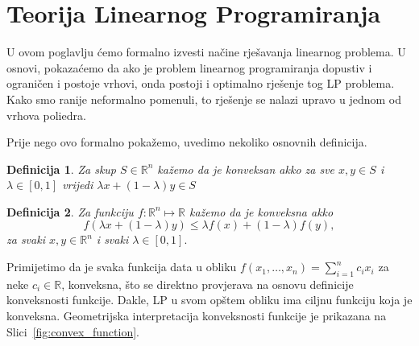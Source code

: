 \documentclass[a4paper, utf8, 11pt, colorlinks]{book}
\newtheorem{definition}{Definicija}
\begin{document}
\section{Teorija Linearnog Programiranja}
U ovom poglavlju ćemo formalno izvesti načine rješavanja linearnog problema. U osnovi, pokazaćemo da ako je problem
linearnog programiranja dopustiv i ograničen i postoje vrhovi, onda postoji i optimalno rješenje tog LP problema. Kako smo ranije neformalno pomenuli,  to rješenje se nalazi upravo u jednom od vrhova poliedra. 

Prije nego ovo formalno pokažemo, uvedimo nekoliko osnovnih definicija. 

\begin{definition}
  Za skup $S \in \mathbb{R}^n$ kažemo da je konveksan akko za sve $x,y\in S$ i $\lambda\in [0, 1]$ vrijedi $\lambda x + (1 - \lambda)y \in S$
\end{definition}
\begin{definition}
   Za funkciju $f:\mathbb{R}^n \mapsto \mathbb{R}$ kažemo da je konveksna akko 
   $$ f( \lambda x + (1-\lambda) y) \leq \lambda f(x) + (1 -\lambda) f(y),$$
   za svaki $x,y \in \mathbb{R}^n$ i svaki $\lambda \in [0,1].$
\end{definition}
Primijetimo da je svaka funkcija data u obliku $f(x_1, \ldots, x_n) = \sum_{i=1}^n c_i x_i$ za neke $c_i \in \mathbb{R}$, konveksna, što se direktno provjerava na osnovu definicije konveksnosti funkcije. Dakle, LP u svom opštem obliku  ima ciljnu funkciju koja je konveksna. Geometrijska interpretacija konveksnosti funkcije je prikazana na Slici~\ref{fig:convex_function}.
\end{document}
